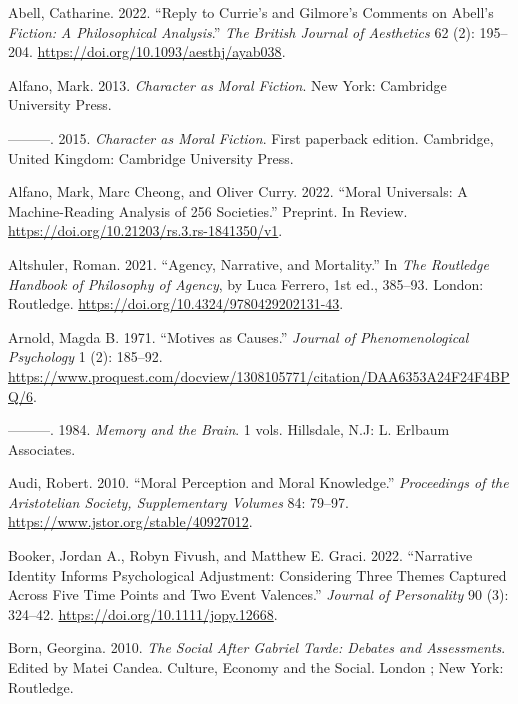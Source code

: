 \documentclass[12pt]{book}
\newenvironment{CSLReferences}%
  {\setlength{\parindent}{0pt}%
   \setlength{\leftskip}{0pt}%
   \setlength{\parskip}{0pt}}%
  {\par}
\theoremstyle{definition}
\theoremstyle{remark}
\begin{document}
\label{refs}
\begin{CSLReferences}{1}{0}
Abell, Catharine. 2022. {``Reply to {Currie}'s and {Gilmore}'s Comments on {Abell}'s {\emph{Fiction}}{\emph{:} }{\emph{A Philosophical Analysis}}.''} \emph{The British Journal of Aesthetics} 62 (2): 195--204. \url{https://doi.org/10.1093/aesthj/ayab038}.

Alfano, Mark. 2013. \emph{Character as Moral Fiction}. New York: Cambridge University Press.

---------. 2015. \emph{Character as Moral Fiction}. First paperback edition. Cambridge, United Kingdom: Cambridge University Press.

Alfano, Mark, Marc Cheong, and Oliver Curry. 2022. {``Moral {Universals}: {A} Machine-Reading Analysis of 256 Societies.''} Preprint. In Review. \url{https://doi.org/10.21203/rs.3.rs-1841350/v1}.

Altshuler, Roman. 2021. {``Agency, Narrative, and Mortality.''} In \emph{The {Routledge Handbook} of {Philosophy} of {Agency}}, by Luca Ferrero, 1st ed., 385--93. London: Routledge. \url{https://doi.org/10.4324/9780429202131-43}.

Arnold, Magda B. 1971. {``Motives as Causes.''} \emph{Journal of Phenomenological Psychology} 1 (2): 185--92. \url{https://www.proquest.com/docview/1308105771/citation/DAA6353A24F24F4BPQ/6}.

---------. 1984. \emph{Memory and the Brain}. 1 vols. Hillsdale, N.J: L. Erlbaum Associates.

Audi, Robert. 2010. {``Moral {Perception} and {Moral Knowledge}.''} \emph{Proceedings of the Aristotelian Society, Supplementary Volumes} 84: 79--97. \url{https://www.jstor.org/stable/40927012}.

Booker, Jordan A., Robyn Fivush, and Matthew E. Graci. 2022. {``Narrative {Identity Informs Psychological Adjustment}: {Considering} Three Themes Captured Across Five Time Points and Two Event Valences.''} \emph{Journal of Personality} 90 (3): 324--42. \url{https://doi.org/10.1111/jopy.12668}.

Born, Georgina. 2010. \emph{The Social After {Gabriel Tarde}: Debates and Assessments}. Edited by Matei Candea. Culture, Economy and the Social. London ; New York: Routledge.


\end{CSLReferences}
\end{document}
